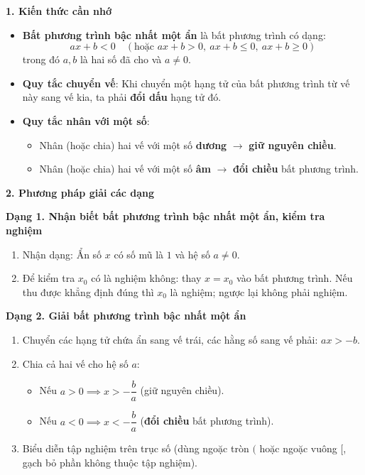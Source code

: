 \textbf{1. Kiến thức cần nhớ}
\begin{itemize}
\item \textbf{Bất phương trình bậc nhất một ẩn} là bất phương trình có dạng:
$$\boxed{ax + b < 0\quad (\text{hoặc } ax + b > 0,\ ax + b \le 0,\ ax + b \ge 0)}$$
trong đó $a, b$ là hai số đã cho và $a \ne 0$.
\item \textbf{Quy tắc chuyển vế}: Khi chuyển một hạng tử của bất phương trình từ vế này sang vế kia, ta phải \textbf{đổi dấu} hạng tử đó.
\item \textbf{Quy tắc nhân với một số}:
\begin{itemize}
\item Nhân (hoặc chia) hai vế với một số \textbf{dương} $\rightarrow$ \textbf{giữ nguyên chiều}.
\item Nhân (hoặc chia) hai vế với một số \textbf{âm} $\rightarrow$ \textbf{đổi chiều} bất phương trình.
\end{itemize}
\end{itemize}

\textbf{2. Phương pháp giải các dạng}

\textbf{Dạng 1. Nhận biết bất phương trình bậc nhất một ẩn, kiểm tra nghiệm}
\begin{enumerate}
\item Nhận dạng: Ẩn số $x$ có số mũ là $1$ và hệ số $a \ne 0$.
\item Để kiểm tra $x_0$ có là nghiệm không: thay $x = x_0$ vào bất phương trình. Nếu thu được khẳng định đúng thì $x_0$ là nghiệm; ngược lại không phải nghiệm.
\end{enumerate}

\textbf{Dạng 2. Giải bất phương trình bậc nhất một ẩn}
\begin{enumerate}
\item Chuyển các hạng tử chứa ẩn sang vế trái, các hằng số sang vế phải: $ax > -b$.
\item Chia cả hai vế cho hệ số $a$:
\begin{itemize}
\item Nếu $a > 0 \implies \boxed{x > -\dfrac{b}{a}}$ (giữ nguyên chiều).
\item Nếu $a < 0 \implies \boxed{x < -\dfrac{b}{a}}$ (\textbf{đổi chiều} bất phương trình).
\end{itemize}
\item Biểu diễn tập nghiệm trên trục số (dùng ngoặc tròn $($ hoặc ngoặc vuông $[$, gạch bỏ phần không thuộc tập nghiệm).
\end{enumerate}


